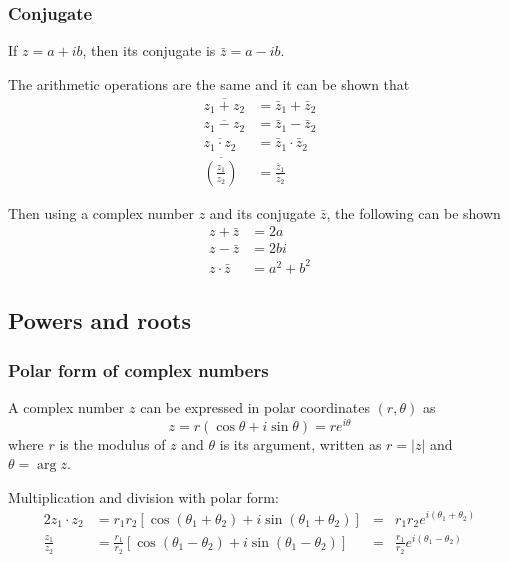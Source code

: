 \documentclass[10pt, twocolumn]{article}
\theoremstyle{definition}
\begin{document}
\subsubsection*{Conjugate}
If \(z = a + ib\), then its conjugate is \(\bar{z} = a - ib\).

The arithmetic operations are the same and it can be shown that
\begin{align*}
  \overline{z_1 + z_2 }                       & = \bar{z}_1 + \bar{z}_2         \\
  \overline{z_1 - z_2 }                       & = \bar{z}_1 - \bar{z}_2         \\
  \overline{z_1 \cdot z_2 }                   & = \bar{z}_1 \cdot \bar{z}_2     \\
  \overline{\left( \frac{z_1 }{z_2 } \right)} & = \frac{\bar{z}_1 }{\bar{z}_2 }
\end{align*}

Then using a complex number \(z\) and its conjugate \(\bar{z}\), the following can be shown
\begin{align*}
  z + \bar{z}     & = 2a        \\
  z - \bar{z}     & = 2bi       \\
  z \cdot \bar{z} & = a^2 + b^2
\end{align*}



\subsection{Powers and roots}
\subsubsection*{Polar form of complex numbers}
A complex number \(z\) can be expressed in polar coordinates \((r,\theta)\) as
\[
  z = r(\cos\theta + i\sin\theta) = re^{i\theta}
\]
where \(r\) is the modulus of \(z\) and \(\theta\) is its argument, written as \(r = |z|\) and \(\theta = \arg{z}\).


Multiplication and division with polar form:
\begin{alignat*}{2}
  z_1 \cdot z_2     & = r_1 r_2 \left[ \cos(\theta_1 + \theta_2 ) + i\sin(\theta_1 + \theta_2 ) \right]          & = & r_1 r_2 e^{i(\theta_1 + \theta_2 )}          \\
  \frac{z_1 }{z_2 } & = \frac{r_1 }{r_2 }\left[ \cos(\theta_1 - \theta_2 ) + i\sin(\theta_1 - \theta_2 ) \right] & = & \frac{r_1 }{r_2 }e^{i(\theta_1 - \theta_2 )}
\end{alignat*}
\end{document}

